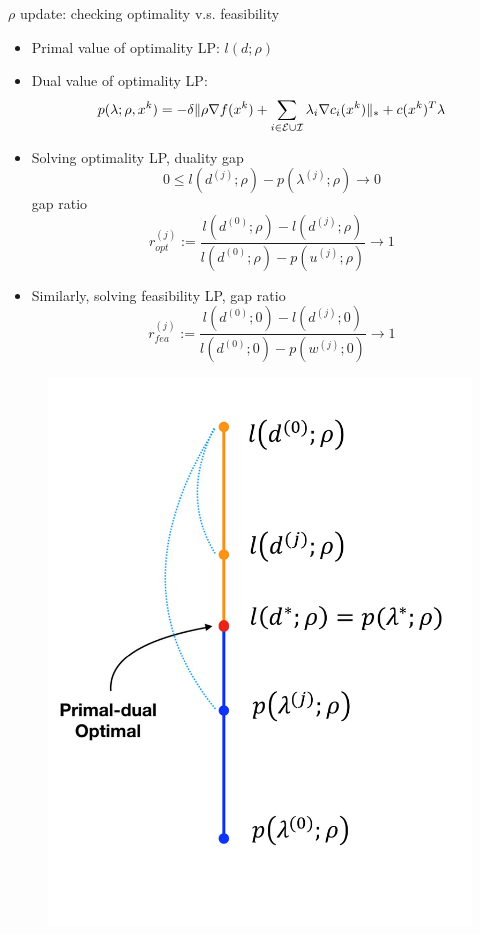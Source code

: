 \documentclass[8pt]{beamer}
\begin{document}
	\begin{frame}{$\rho$ update: checking optimality v.s. feasibility}
		\begin{itemize}
			\item Primal value of optimality LP: $l(d;\rho)$
			\item Dual value of optimality LP: 
				$$ p(\lambda; \rho, x^k) =  -  \delta    \|\rho \nabla f(x^k)+\sum_{i\in{\cal E}\cup{\cal I}}\lambda_i \nabla c_i(x^k) \|_* + c(x^k)^T\lambda$$
		\end{itemize}
		\vfill
		\begin{minipage}[t]{.6\textwidth}\begin{itemize} 
			\item Solving   optimality LP, duality gap 
				$$ 0\le l(d^{(j)}; \rho) - p(\lambda^{(j)}; \rho)   \to 0$$
				gap ratio
				$$r^{(j)}_{opt} := \frac{l(d^{(0)};\rho) - l(d^{(j)};\rho)   }{l(d^{(0)}; \rho) - p (u^{(j)};\rho)  } \to 1$$
			\item Similarly, solving  feasibility LP, gap ratio
				$$r^{(j)}_{fea} := \frac{l(d^{(0)};0) - l(d^{(j)};0)   }{l(d^{(0)}; 0)- p(w^{(j)};0)  }  \to 1 $$
		\end{itemize}\end{minipage}
		\hfill
		\begin{minipage}[t]{.35\textwidth}\begin{figure}[htbp]
			\centering
			\includegraphics[width=\textwidth]{pic/primaldual.pdf}\\
		\end{figure}\end{minipage}
	\end{frame}
\end{document}
